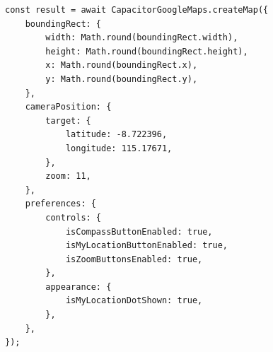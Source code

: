 \begin{itemize}
\begin{lstlisting}[label={lst:createMapGoogleMaps}, caption=\textit{Method} createMap() Pada Capacitor Community Google Maps]
const result = await CapacitorGoogleMaps.createMap({
	boundingRect: {
		width: Math.round(boundingRect.width),
        height: Math.round(boundingRect.height),
        x: Math.round(boundingRect.x),
        y: Math.round(boundingRect.y),
    },
    cameraPosition: {
        target: {
        	latitude: -8.722396,
            longitude: 115.17671,
        },
        zoom: 11,
    },
    preferences: {
        controls: {
    	    isCompassButtonEnabled: true,
            isMyLocationButtonEnabled: true,
            isZoomButtonsEnabled: true,
        },
        appearance: {
            isMyLocationDotShown: true,
        },
    },
});
\end{lstlisting}


\end{itemize}
